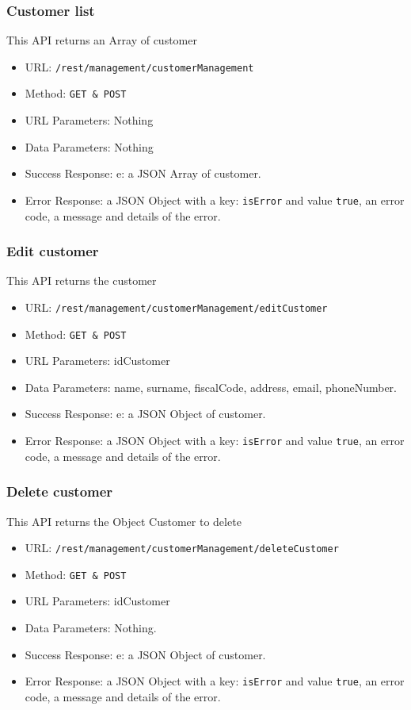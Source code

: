 \subsubsection*{Customer list}
This API returns an Array of customer

\begin{itemize}
    \item URL: \texttt{/rest/management/customerManagement}
    \item Method: \texttt{{GET \& POST}}
    \item URL Parameters: Nothing
    \item Data Parameters: Nothing
    \item Success Response: e: a JSON Array of customer.
    \item Error Response: a JSON Object with a key: \texttt{isError}  and value \texttt{true}, an error code, a message and details of the error.
\end{itemize}

\subsubsection*{Edit customer}
This API returns the customer
\begin{itemize}
    \item URL: \texttt{/rest/management/customerManagement/editCustomer
}
    \item Method: \texttt{{GET \& POST}}
    \item URL Parameters: idCustomer
    \item Data Parameters: name, surname, fiscalCode, address, email, phoneNumber.
    \item Success Response: e: a JSON Object of customer.
    \item Error Response: a JSON Object with a key: \texttt{isError}  and value \texttt{true}, an error code, a message and details of the error.
\end{itemize}

\subsubsection*{Delete customer}
This API returns the Object Customer to delete
\begin{itemize}
    \item URL: \texttt{/rest/management/customerManagement/deleteCustomer
}
    \item Method: \texttt{{GET \& POST}}
    \item URL Parameters: idCustomer
    \item Data Parameters: Nothing.
    \item Success Response: e: a JSON Object of customer.
    \item Error Response: a JSON Object with a key: \texttt{isError}  and value \texttt{true}, an error code, a message and details of the error.
\end{itemize}

